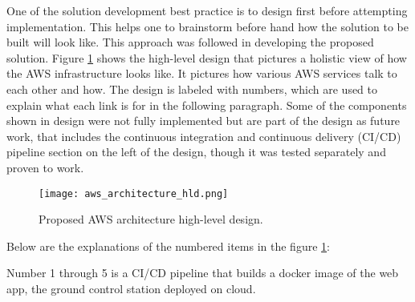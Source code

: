 One of the solution development best practice is to design first before attempting implementation. This helps one to brainstorm before hand how the solution to be built will look like. This approach was followed in developing the proposed solution. Figure \ref{fig:aws-architecture-hld} shows the high-level design that pictures a holistic view of how the AWS infrastructure looks like. It pictures how various AWS services talk to each other and how. The design is labeled with numbers, which are used to explain what each link is for in the following paragraph. Some of the components shown in design were not fully implemented but are part of the design as future work, that includes the continuous integration and continuous delivery (CI/CD) pipeline section on the left of the design, though it was tested separately and proven to work.

\begin{figure}[H]
    \centering \texttt{[image: aws\_architecture\_hld.png]}
    \caption{Proposed AWS architecture high-level design.}
    \label{fig:aws-architecture-hld}
\end{figure}

Below are the explanations of the numbered items in the figure \ref{fig:aws-architecture-hld}:

Number 1 through 5 is a CI/CD pipeline that builds a docker image of the web app, the ground control station deployed on cloud.

